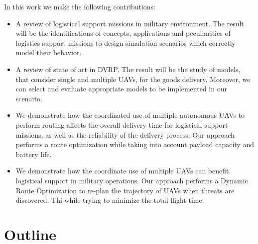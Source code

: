 In this work we make the following contributions:

\begin{itemize}

    \item A review of logistical support missions in military environment. The result will be the identifications of  concepts, applications and peculiarities of logistics support missions to design simulation scenarios which correctly model their behavior.
    
    \item A review of state of art in DVRP. The result will be the study of models, that consider single and multiple UAVs, for the goods delivery. Moreover, we can select and evaluate appropriate models to be implemented in our scenario.
    
    \item We demonstrate how the coordinated use of multiple autonomous UAVs to perform routing affects the overall delivery time for logistical support missions, as well as the reliability of the delivery process. Our approach performs a route optimization while taking into account payload capacity and battery life.
    
    \item We demonstrate how the coordinate use of multiple UAVs can benefit logistical support in military operations. Our approach performs a Dynamic Route Optimization to re-plan the trajectory of UAVs when threats are discovered. Thi while trying to minimize the total flight time.
    
\end{itemize}


\section{Outline}






